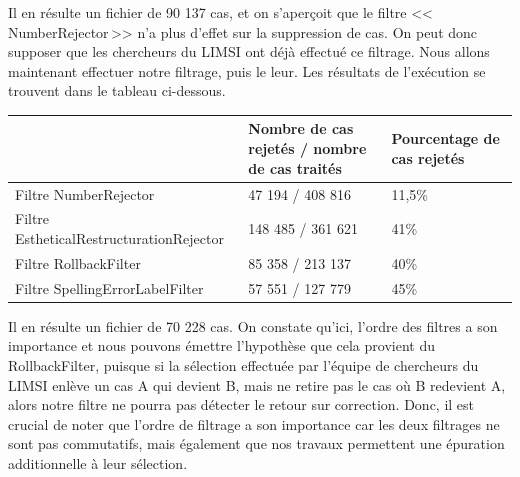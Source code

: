\documentclass[11pt]{article}
\begin{document}
Il en r\'{e}sulte un fichier de 90 137 cas, et on s'aper\c{c}oit que le filtre <<\,NumberRejector\,>> n'a plus d'effet sur la suppression de cas. On peut donc supposer que les chercheurs du LIMSI ont d\'{e}j\`{a} effectu\'{e} ce filtrage.
\newline
\newline
Nous allons maintenant effectuer notre filtrage, puis le leur.
Les r\'{e}sultats de l'ex\'{e}cution se trouvent dans le tableau ci-dessous.

\begin{center}
\begin{tabular}{|M{6cm}|M{5cm}|M{6cm}|}
   \hline
    \, &Nombre de cas rejet\'{e}s / nombre de cas trait\'{e}s & Pourcentage de cas rejet\'{e}s \tabularnewline
    \hline
     Filtre NumberRejector & 47 194 / 408 816 & 11,5\% \tabularnewline
\hline
Filtre EstheticalRestructurationRejector & 148 485 / 361 621 & 41\% \tabularnewline
\hline
Filtre RollbackFilter & 85 358 / 213 137 & 40\% \tabularnewline
 \hline
    Filtre SpellingErrorLabelFilter & 57 551 / 127 779 & 45\% \tabularnewline
   \hline
   \end{tabular}
\end{center}
Il en r\'{e}sulte un fichier de 70 228 cas.
\newline
On constate qu'ici, l'ordre des filtres a son importance et nous pouvons \'{e}mettre l'hypoth\`{e}se que cela provient du RollbackFilter, puisque si la s\'{e}lection effectu\'{e}e par l'\'{e}quipe de chercheurs du LIMSI enl\`{e}ve un cas A qui devient B, mais ne retire pas le cas o\`{u} B redevient A, alors notre filtre ne pourra pas d\'{e}tecter le retour sur correction.
Donc, il est crucial de noter que l'ordre de filtrage a son importance car les deux filtrages ne sont pas commutatifs, mais \'{e}galement que nos travaux permettent une \'{e}puration additionnelle \`{a} leur s\'{e}lection.


\end{document}
